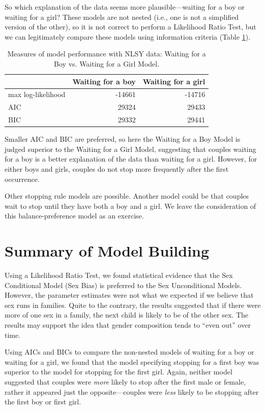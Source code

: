 \documentclass[
]{krantz}
\begin{document}
So which explanation of the data seems more plausible---waiting for a boy or waiting for a girl? These models are not nested (i.e., one is not a simplified version of the other), so it is not correct to perform a Likelihood Ratio Test, but we can legitimately compare these models using information criteria (Table \ref{tab:tab1chp2}).

\begin{table}

\caption{\label{tab:tab1chp2}Measures of model performance with NLSY data: Waiting for a Boy vs. Waiting for a Girl Model.}
\centering
\begin{tabular}[t]{lrr}
\toprule
  & Waiting for a boy & Waiting for a girl\\
\midrule
max log-likelihood & -14661 & -14716\\
AIC & 29324 & 29433\\
BIC & 29332 & 29441\\
\bottomrule
\end{tabular}
\end{table}

Smaller AIC and BIC are preferred, so here the Waiting for a Boy Model is judged superior to the Waiting for a Girl Model, suggesting that couples waiting for a boy is a better explanation of the data than waiting for a girl. However, for either boys and girls, couples do not stop more frequently after the first occurrence.

Other stopping rule models are possible. Another model could be that couples wait to stop until they have both a boy and a girl. We leave the consideration of this balance-preference model as an exercise.

\hypertarget{summary-of-model-building}{%
\section{Summary of Model Building}\label{summary-of-model-building}}

Using a Likelihood Ratio Test, we found statistical evidence that the Sex Conditional Model (Sex Bias) is preferred to the Sex Unconditional Models. However, the parameter estimates were not what we expected if we believe that sex runs in families. Quite to the contrary, the results suggested that if there were more of one sex in a family, the next child is likely to be of the other sex. The results may support the idea that gender composition tends to ``even out'' over time.

Using AICs and BICs to compare the non-nested models of waiting for a boy or waiting for a girl, we found that the model specifying stopping for a first boy was superior to the model for stopping for the first girl. Again, neither model suggested that couples were \emph{more} likely to stop after the first male or female, rather it appeared just the opposite---couples were \emph{less} likely to be stopping after the first boy or first girl.
\end{document}
